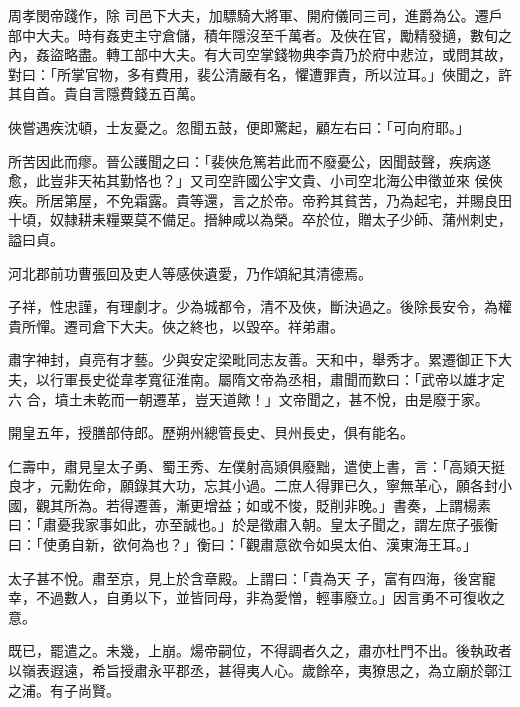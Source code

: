 \begin{pinyinscope}
 周孝閔帝踐作，除
 司邑下大夫，加驃騎大將軍、開府儀同三司，進爵為公。遷戶部中大夫。時有姦吏主守倉儲，積年隱沒至千萬者。及俠在官，勵精發擿，數旬之內，姦盜略盡。轉工部中大夫。有大司空掌錢物典李貴乃於府中悲泣，或問其故，對曰：「所掌官物，多有費用，裴公清嚴有名，懼遭罪責，所以泣耳。」俠聞之，許其自首。貴自言隱費錢五百萬。



 俠嘗遇疾沈頓，士友憂之。忽聞五鼓，便即驚起，顧左右曰：「可向府耶。」



 所苦因此而瘳。晉公護聞之曰：「裴俠危篤若此而不廢憂公，因聞鼓聲，疾病遂愈，此豈非天祐其勤恪也？」又司空許國公宇文貴、小司空北海公申徵並來
 侯俠疾。所居第屋，不免霜露。貴等還，言之於帝。帝矜其貧苦，乃為起宅，并賜良田十頃，奴隸耕耒糧粟莫不備足。搢紳咸以為榮。卒於位，贈太子少師、蒲州刺史，謚曰貞。



 河北郡前功曹張回及吏人等感俠遺愛，乃作頌紀其清德焉。



 子祥，性忠謹，有理劇才。少為城都令，清不及俠，斷決過之。後除長安令，為權貴所憚。遷司倉下大夫。俠之終也，以毀卒。祥弟肅。



 肅字神封，貞亮有才藝。少與安定梁毗同志友善。天和中，舉秀才。累遷御正下大夫，以行軍長史從韋孝寬征淮南。屬隋文帝為丞相，肅聞而歎曰：「武帝以雄才定六
 合，墳土未乾而一朝遷革，豈天道歟！」文帝聞之，甚不悅，由是廢于家。



 開皇五年，授膳部侍郎。歷朔州總管長史、貝州長史，俱有能名。



 仁壽中，肅見皇太子勇、蜀王秀、左僕射高熲俱廢黜，遣使上書，言：「高熲天挺良才，元勳佐命，願錄其大功，忘其小過。二庶人得罪已久，寧無革心，願各封小國，觀其所為。若得遷善，漸更增益；如或不悛，貶削非晚。」書奏，上謂楊素曰：「肅憂我家事如此，亦至誠也。」於是徵肅入朝。皇太子聞之，謂左庶子張衡曰：「使勇自新，欲何為也？」衡曰：「觀肅意欲令如吳太伯、漢東海王耳。」



 太子甚不悅。肅至京，見上於含章殿。上謂曰：「貴為天
 子，富有四海，後宮寵幸，不過數人，自勇以下，並皆同母，非為愛憎，輕事廢立。」因言勇不可復收之意。



 既已，罷遣之。未幾，上崩。煬帝嗣位，不得調者久之，肅亦杜門不出。後執政者以嶺表遐遠，希旨授肅永平郡丞，甚得夷人心。歲餘卒，夷獠思之，為立廟於鄣江之浦。有子尚賢。




\end{pinyinscope}
